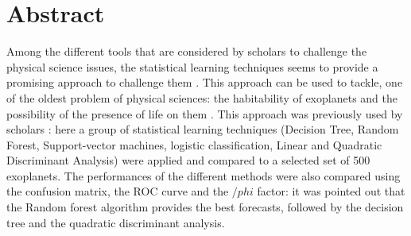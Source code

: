 \documentclass[
12pt, %
a4paper, %
oneside, %
headinclude,footinclude, %
BCOR5mm, %
]{scrartcl}
\begin{document}
\newpage



\section*{Abstract} %
Among the different tools that are considered by scholars to challenge the physical science issues, the statistical learning techniques seems to provide a promising approach to challenge them \cite{carleo2019machine}. This approach can be used to tackle, one of the oldest problem of physical sciences:  the habitability of exoplanets and the possibility of the presence of life on them \cite{seager2013exoplanet}. This approach was previously used by scholars \cite{armstrong2020exoplanet,saha2018machine}: here a group of statistical learning techniques (Decision Tree, Random Forest, Support-vector machines, logistic classification, Linear and Quadratic Discriminant Analysis) were applied and compared to a selected set of 500 exoplanets. The performances of the different methods were also compared using the confusion matrix, the ROC curve and the $/phi$ factor: it was pointed out that the Random forest algorithm provides the best forecasts, followed by the decision tree and the quadratic discriminant analysis. 

\nocite{*}
\setcounter{tocdepth}{2} %

\tableofcontents %




\newpage %
\end{document}
